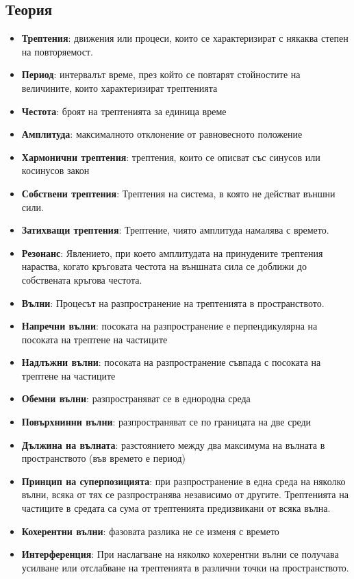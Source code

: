 \documentclass[fleqn, 12pt]{article}
\theoremstyle{definition}
\begin{document}
\subsection{Теория}
\begin{itemize}
\item \textbf{Трептения}: движения или процеси, които се характеризират с някаква степен на повторяемост.
\item \textbf{Период}: интервалът време, през който се повтарят стойностите на величините, които характеризират трептенията
\item \textbf{Честота}:  броят на трептенията за единица време
\item \textbf{Амплитуда}:  максималното отклонение от равновесното положение
\item \textbf{Хармонични трептения}: трептения, които се описват със синусов или косинусов закон
\item \textbf{Собствени трептения}: Трептения на система, в която не действат външни сили. 
\item \textbf{Затихващи трептения}: Трептение, чиято амплитуда намалява с времето.
\item \textbf{Резонанс}: Явлението, при което амплитудата на принудените трептения нараства,
когато кръговата честота на външната сила се доближи до собствената кръгова
честота.
\item \textbf{Вълни}: Процесът на разпространение на трептенията в пространството.
\item \textbf{Напречни вълни}: посоката на разпространение е перпендикулярна на посоката на трептене на частиците
\item \textbf{Надлъжни вълни}: посоката на разпространение съвпада с посоката на трептене на частиците
\item \textbf{Обемни вълни}: разпространяват се в еднородна среда
\item \textbf{Повърхнинни вълни}: разпространяват се по границата на две среди
\item \textbf{Дължина на вълната}: разстоянието между два максимума на вълната в пространството (във времето е период)
\item \textbf{Принцип на суперпозицията}: при разпространение в една среда на
няколко вълни, всяка от тях се разпространява независимо от другите. Трептенията на
частиците в средата са сума от трептенията предизвикани от всяка вълна.
\item \textbf{Кохерентни вълни}: фазовата разлика не се изменя с времето
\item \textbf{Интерференция}: При наслагване на няколко кохерентни вълни се получава усилване
или отслабване на трептенията в различни точки на пространството.
\end{itemize}
\end{document}
